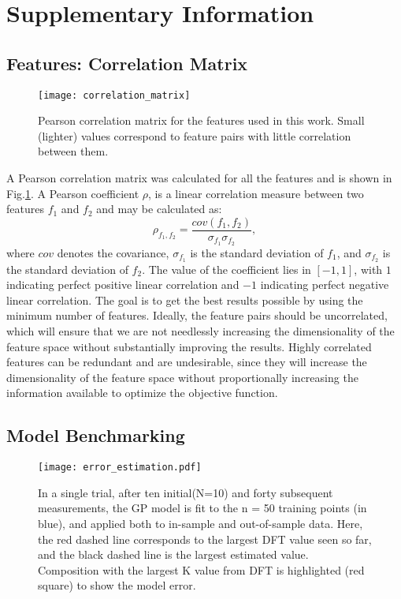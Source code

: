\documentclass[preprint,amsmath,amssymb,aps, prb,showkeys]{revtex4-1}
\begin{document}
\section{Supplementary Information}
\label{sec:app}

\subsection{Features: Correlation Matrix}

\begin{figure}[h!]
\centering
\texttt{[image: correlation\_matrix]}
\caption{Pearson correlation matrix for the features used in this work. Small (lighter) values correspond to feature pairs with little correlation between them.}
\label{fig:Pearson}
\end{figure}


A Pearson correlation matrix  \cite{pearson1895notes} was calculated for all the features and is shown in Fig.\ref{fig:Pearson}. A Pearson coefficient $\rho$, is a linear correlation measure between two features $f_1$ and $f_2$ and may be calculated as:
\begin{equation}
\rho_{f_1,f_2} = \frac{cov (f_1,f_2)}{\sigma_{f_1} \sigma_{f_2}},
\end{equation}
where $cov$ denotes the covariance, $\sigma_{f_1}$ is the standard deviation of $f_1$, and $\sigma_{f_2}$ is the standard deviation of $f_2$. The value of the coefficient lies in $[-1,1]$, with $1$ indicating perfect positive linear correlation and $-1$ indicating perfect negative linear correlation. The goal is to get the best results possible by using the minimum number of features. Ideally, the feature pairs should be uncorrelated, which will ensure that we are not needlessly increasing the dimensionality of the feature space without substantially improving the results. Highly correlated features can be redundant and are undesirable, since they will increase the dimensionality of the feature space without proportionally increasing the information available to optimize the objective function.


\subsection{Model Benchmarking}

\begin{figure}[h!]
    \centering
    \texttt{[image: error\_estimation.pdf]}
    \caption{In a single trial, after ten initial(N=10) and forty subsequent measurements, the GP model is fit to the n = 50  training points (in blue), and applied both to in-sample and out-of-sample data. Here, the red dashed line  corresponds to the largest DFT value seen so far, and the black dashed line  is the largest estimated value. Composition with the largest K value from DFT is highlighted (red square) to show the model error.}
    \label{fig:error_estimation}
\end{figure}
\end{document}
